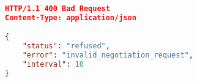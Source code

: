 

\begin{lstlisting}[language=json,firstnumber=1]
HTTP/1.1 400 Bad Request
Content-Type: application/json

{
    "status": "refused",
    "error": "invalid_negotiation_request",
    "interval": 10
}

\end{lstlisting}